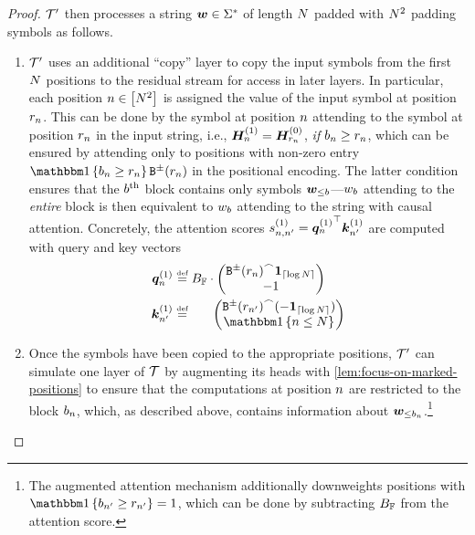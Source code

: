 \begin{proof}
   ${{\mathcal{T}}}'$ then processes a string ${{\boldsymbol{w}}} \in {{{{{{\Sigma}}^{*}}}}}$ of length ${{N}}$ padded with ${{N}}^2$ padding symbols as follows.
   \begin{enumerate}[label=(\arabic*)]
      \item ${{\mathcal{T}}}'$ uses an additional ``copy'' layer to copy the input symbols from the first ${{N}}$ positions to the residual stream for access in later layers.
      In particular, each position ${{n}} \in {\left[ {{N}}^2 \right]}$ is assigned the value of the input symbol at position ${{r}}_{{{n}}}$.
      This can be done by the symbol at position ${{n}}$ attending to the symbol at position ${{r}}_{{{n}}}$ in the input string, i.e., ${{{{{\bm{H}}}}}}^{(1)}_{{{n}}} = {{{{{\bm{H}}}}}}^{(0)}_{{{r}}_{{{n}}}}$, \emph{if} ${{b}}_{{n}} \ge {{r}}_{{{n}}}$, which can be ensured by attending only to positions with non-zero entry $\ind{\paddingBlock_\stridx \ge \relativePos_{\stridx}} \sbinFun{\relativePos_{\stridx}}$ in the positional encoding.
      The latter condition ensures that the ${{b}}\textsuperscript{th}$ block contains only symbols ${{\boldsymbol{w}}}_{\leq {{b}}}$---${{w}}_{{b}}$ attending to the \emph{entire} block is then equivalent to ${{w}}_{{b}}$ attending to the string with causal attention.
      Concretely, the attention scores ${{{s}}}^{(1)}_{{{n}}, {{n}}'} = {{{{{{\bm{q}}}}^{(1)}_{{{n}}}}^\top {{{\bm{k}}}}^{(1)}_{{{n}}'}}}$ are computed with query and key vectors
      \begin{subequations}
         \begin{align}
            \vq^{(1)}_\stridx &\defeq \maxFNum \cdot 
            \begin{pmatrix}
               \interleaveFun{\sbinFun{\relativePos_\stridx}}{\one_{\ceil{\log\strlen}}} \\
               -1
            \end{pmatrix} \\
            \vk^{(1)}_{\stridx'} &\defeq \phantom{\maxFNum \cdot} 
            \begin{pmatrix}
               \interleaveFun{\sbinFun{\relativePos_{\stridx'}}}{(-\one_{\ceil{\log\strlen}})} \\
               \ind{\stridx \le \strlen}
            \end{pmatrix}
         \end{align}
      \end{subequations}
      \item Once the symbols have been copied to the appropriate positions, ${{\mathcal{T}}}'$ can simulate one layer of ${{\mathcal{T}}}$ by augmenting its heads with \cref{lem:focus-on-marked-positions} to ensure that the computations at position ${{n}}$ are restricted to the block ${{b}}_{{n}}$, which, as described above, contains information about ${{\boldsymbol{w}}}_{\le {{b}}_{{n}}}$.\footnote{The augmented attention mechanism additionally downweights positions with $\ind{\paddingBlock_{\stridx'} \ge \relativePos_{\stridx'}} = 1$, which can be done by subtracting ${{B_{{{\mathbb{F}}}}}}$ from the attention score.}

\end{enumerate}
\end{proof}
